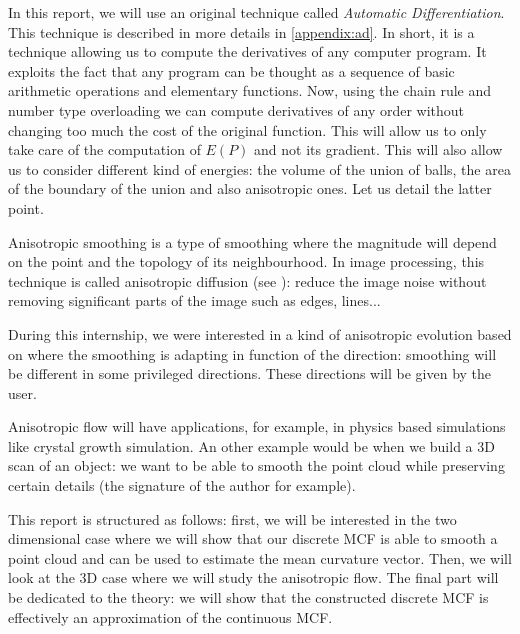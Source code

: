 In this report, we will use an original technique called \textit{Automatic
    Differentiation}. This technique is described in more details in
\ref{appendix:ad}. In short, it is a technique allowing us to compute the
derivatives of any computer program. It exploits the fact that any program can
be thought as a sequence of basic arithmetic operations and elementary
functions. Now, using the chain rule and number type overloading we can compute
derivatives of any order without changing too much the cost of the original
function.  This will allow us to only take care of the computation of $ E(P) $
and not its gradient. This will also allow us to consider different kind of
energies: the volume of the union of balls, the area of the boundary of the
union and also anisotropic ones. Let us detail the latter point.


Anisotropic smoothing is a type of smoothing where the magnitude will depend on
the point and the topology of its neighbourhood. In image processing, this
technique is called anisotropic diffusion (see \cite{weickert1998anisotropic}):
reduce the image noise without removing significant parts of the image such as
edges, lines...

During this internship, we were interested in a kind of anisotropic evolution
based on \cite{chambolle2012nonlocal} where the smoothing is adapting in
function of the direction: smoothing will be different in some privileged
directions. These directions will be given by the user.

Anisotropic flow will have applications, for example, in physics based
simulations like crystal growth simulation.  An other example would be when we
build a 3D scan of an object: we want to be able to smooth the point cloud while
preserving certain details (the signature of the author for example).

This report is structured as follows: first, we will be interested in the two
dimensional case where we will show that our discrete MCF is able to smooth a
point cloud and can be used to estimate the mean curvature vector. Then, we will
look at the 3D case where we will study the anisotropic flow. The final part
will be dedicated to the theory: we will show that the constructed discrete MCF
is effectively an approximation of the continuous MCF.


